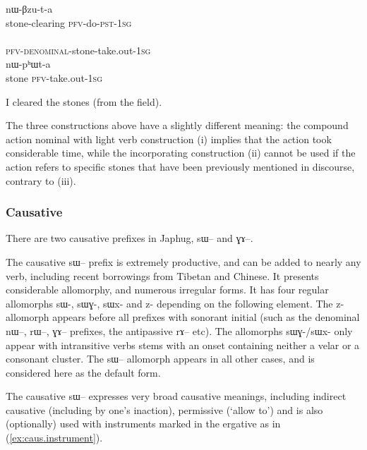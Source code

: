 \documentclass[oldfontcommands,oneside,a4paper,11pt]{article}
\newcommand{\ipa}[1]{{\phon#1}} %
\newcommand{\refb}[1]{(\ref{#1})}
\begin{document}
\begin{exe}   
\ex
\begin{xlist}[(ii)]
\gll     \ipa{cɯ-pʰɯt} \ipa{nɯ-βzu-t-a}  \\
  stone-clearing \textsc{pfv}-do-\textsc{pst}-\textsc{1sg} \\
\gll     \ipa{nɯ-ɣɯ-cɯ-pʰɯt-a}  \\
  \textsc{pfv-denominal}-stone-take.out-\textsc{1sg} \\
\gll     \ipa{cɯ} \ipa{nɯ-pʰɯt-a}  \\
  stone \textsc{pfv}-take.out-\textsc{1sg} \\
  \end{xlist}
 \glt   I cleared the stones (from the field). 
\end{exe}   

The three constructions above have a slightly different meaning: the compound action nominal with light verb construction (i) implies that the action took considerable time, while the incorporating construction (ii) cannot be used if the action refers to specific stones that have been previously mentioned in discourse, contrary  to (iii).

\subsubsection{Causative}
There are two causative prefixes in Japhug, \ipa{sɯ--} and \ipa{ɣɤ--}. 

The causative   \ipa{sɯ--} prefix is extremely productive, and can be added to nearly any verb, including recent borrowings from Tibetan and Chinese. It presents  considerable allomorphy, and numerous irregular forms. It has four regular allomorphs \ipa{sɯ-}, \ipa{sɯɣ-}, \ipa{sɯx-} and \ipa{z-} depending on the following element. The \ipa{z-} allomorph appears before all prefixes with sonorant initial (such as the denominal \ipa{nɯ--}, \ipa{rɯ--}, \ipa{ɣɤ--} prefixes, the antipassive \ipa{rɤ--} etc). The allomorphs \ipa{sɯɣ-}/\ipa{sɯx-}  only appear  with intransitive verbs stems with an onset containing neither a velar or a consonant cluster. The \ipa{sɯ--} allomorph appears in all other cases, and is considered here as the default form.


The causative   \ipa{sɯ--}  expresses very broad causative meanings, including indirect causative (including by one's inaction), permissive (`allow to') and is also (optionally) used with  instruments marked in the ergative as in \refb{ex:caus.instrument}.
\end{document}
